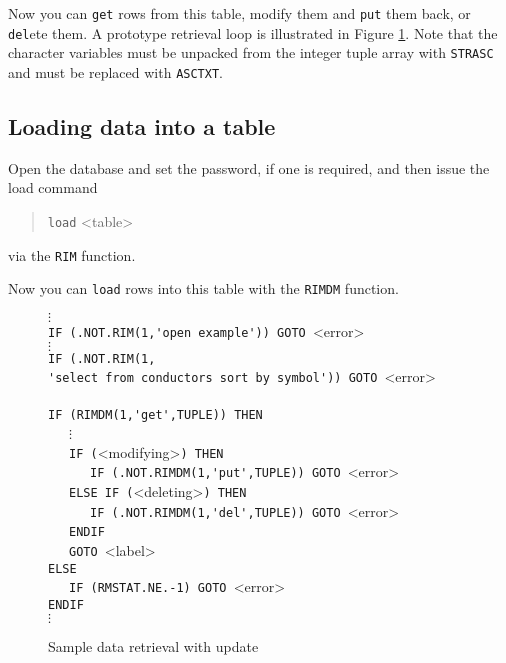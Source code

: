 \documentclass[11pt,a4paper]{report}
\begin{document}
Now you can \verb!get! rows from this table, modify them
and \verb!put! them back, or \verb!del!ete them.
A prototype retrieval loop is illustrated in Figure \ref{pi-ret}.
Note that the character variables must be unpacked from the integer
tuple array with \verb!STRASC! and must be replaced with \verb!ASCTXT!.
 

\subsection{Loading data into a table}
%
Open the database and set the password, if one is required, and then
issue the load command
\begin{verse}
  \verb!load! <table>
\end{verse}
via the \verb!RIM! function.
 
Now you can \verb!load! rows into this table with the
\verb!RIMDM! function.
 
\begin{figure}
$\vdots$\\
    \verb!IF (.NOT.RIM(1,'open example')) GOTO !<error>\\
    $\vdots$\\
    \verb!IF (.NOT.RIM(1,! \\
       \verb!'select from conductors sort by symbol')) GOTO !<error>\\
    \\
    \verb!IF (RIMDM(1,'get',TUPLE)) THEN!  \\
    ~~~$\vdots$\\
    ~~~\verb!IF (!<modifying>\verb!) THEN!\\
    ~~~~~~\verb!IF (.NOT.RIMDM(1,'put',TUPLE)) GOTO !<error>\\
    ~~~\verb!ELSE IF (!<deleting>\verb!) THEN !\\
    ~~~~~~\verb!IF (.NOT.RIMDM(1,'del',TUPLE)) GOTO !<error>\\
    ~~~\verb!ENDIF!\\
    ~~~\verb!GOTO !<label>\\
    \verb!ELSE! \\
    ~~~\verb!IF (RMSTAT.NE.-1) GOTO !<error>\\
    \verb!ENDIF! \\
    $\vdots$
\caption{Sample data retrieval with update}
\label{pi-ret}
\end{figure}
 
 
 
\end{document}
